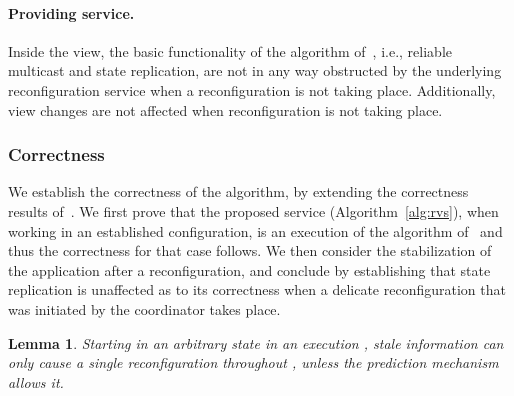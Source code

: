 \documentclass[11pt]{article}
\newtheorem{lemma}[theorem]{Lemma}
\begin{document}
\paragraph{Providing service.} 
Inside the view, the basic functionality of the algorithm of~\cite{SSVS}, i.e., reliable multicast and state replication, are not in any way obstructed by the underlying reconfiguration service when a reconfiguration is not taking place. 
Additionally, view changes are not affected when reconfiguration is not taking place.








\subsubsection{Correctness}
We establish the correctness of the algorithm, by extending the correctness results of~\cite{SSVS}. 
We first prove that the proposed service (Algorithm~\ref{alg:rvs}), when working in an established configuration, is an execution of the algorithm of~\cite{SSVS} and thus the correctness for that case follows.
We then consider the stabilization of the application after a reconfiguration, and conclude by establishing that state replication is unaffected as to its correctness when a delicate reconfiguration that was initiated by the coordinator takes place.


\begin{lemma}
\label{thVS:noStaleRecon}
Starting in an arbitrary state in an execution , stale information can only cause a single reconfiguration throughout , unless the prediction mechanism  allows it. 
\end{lemma}
\end{document}
